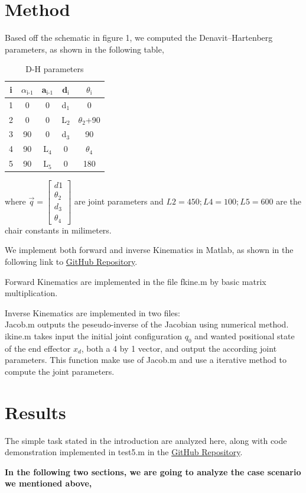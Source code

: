 \documentclass[12pt, letterpaper]{amsart} %
\numberwithin{equation}{section}
\begin{document}
\section{Method}
Based off the schematic in figure 1, we computed the Denavit–Hartenberg parameters, as shown in the following table,
\begin{table}[H]
  \centering
  \begin{tabular}{c|cccc}
i & $\alpha$$_{\text{i-1}}$ & a$_{\text{i-1}}$ & d$_{\text{i}}$ & $\theta$$_{\text{i}}$\\
\hline
1 & 0 & 0 & d$_{\text{1}}$ & 0\\
2 & 0 & 0 & L$_{\text{2}}$ & $\theta_2$+90\\
3 & 90 & 0 & d$_{\text{3}}$ & 90\\
4 & 90 & L$_{\text{4}}$ & 0 & $\theta$$_{\text{4}}$\\
5 & 90 & L$_{\text{5}}$ & 0 & 180\\
\end{tabular}
  \caption{D-H parameters}
\end{table}
where $\vec{q} =
\begin{bmatrix}
  d1 \\ \theta_2 \\ d_3 \\ \theta_4
\end{bmatrix}
$ are joint parameters and $L2 = 450; L4 = 100; L5 = 600$ are the chair constants in milimeters.
\par
We implement both forward and inverse Kinematics in Matlab, as shown in the following link to  \href{https://github.com/ckwojai/EE183_LAB/tree/master/lab1/code}{GitHub Repository}. \par
Forward Kinematics are implemented in the file fkine.m by basic matrix multiplication. \par
Inverse Kinematics are implemented in two files: \\
Jacob.m outputs the peseudo-inverse of the Jacobian using numerical method. \\
ikine.m takes input the initial joint configuration $q_0$ and wanted positional state of the end effector $x_d$, both a 4 by 1 vector, and output the according joint parameters. This function make use of Jacob.m and use a iterative method to compute the joint parameters.

\section{Results}
The simple task stated in the introduction are analyzed here, along with code demonstration implemented in test5.m in the \href{https://github.com/ckwojai/EE183_LAB/tree/master/lab1/code}{GitHub Repository}. \par
\textbf{In the following two sections, we are going to analyze the case scenario we mentioned above,}
\end{document}
